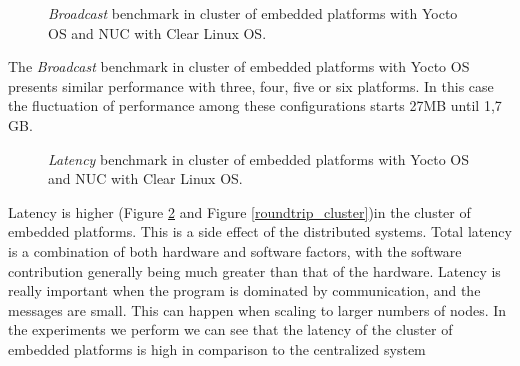 \begin{figure}[H]
\begin{center}
\end{center}
\caption{\textit{Broadcast} benchmark in cluster of embedded platforms with Yocto OS and NUC
with Clear Linux OS.}
\label{broadcast_cluster}
\end{figure}

The \textit{Broadcast} benchmark in cluster of embedded platforms with Yocto OS
presents similar performance with three, four, five or six platforms. In this
case the fluctuation of performance among these configurations starts 27MB
until 1,7 GB.

\begin{figure}[H]
\begin{center}
\end{center}
\caption{\textit{Latency} benchmark in cluster of embedded platforms with Yocto OS and NUC
with Clear Linux OS.}
\label{latency_cluster}
\end{figure}

Latency is higher (Figure \ref{latency_cluster} and Figure
\ref{roundtrip_cluster})in the cluster of embedded platforms.  This is a side
effect of the distributed systems.  Total latency is a combination of both
hardware and software factors, with the software contribution generally being
much greater than that of the hardware. Latency is really important when the
program is dominated by communication, and the messages are small.  This can
happen when scaling to larger numbers of nodes. In the experiments we perform we
can see that the latency of the cluster of embedded platforms is high in
comparison to the centralized system \cite{NUC} 

